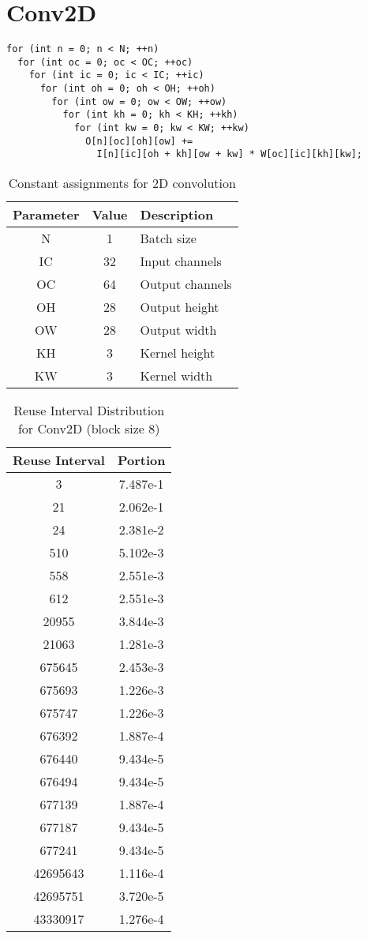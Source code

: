 \documentclass[conference]{article}
\begin{document}
\section{Conv2D}
\begin{verbatim}
for (int n = 0; n < N; ++n)
  for (int oc = 0; oc < OC; ++oc)
    for (int ic = 0; ic < IC; ++ic)
      for (int oh = 0; oh < OH; ++oh)
        for (int ow = 0; ow < OW; ++ow)
          for (int kh = 0; kh < KH; ++kh)
            for (int kw = 0; kw < KW; ++kw)
              O[n][oc][oh][ow] +=
                I[n][ic][oh + kh][ow + kw] * W[oc][ic][kh][kw];
\end{verbatim}

\begin{table}[h]
\centering
\begin{tabular}{|c|c|l|}
\hline
Parameter & Value & Description \\
\hline
 N & 1 & Batch size \\
IC & 32 & Input channels \\
OC & 64 & Output channels \\
OH & 28 & Output height \\
OW & 28 & Output width \\
KH & 3 & Kernel height \\
KW & 3 & Kernel width \\
\hline
\end{tabular}
\caption{Constant assignments for 2D convolution}
\end{table}

\begin{table}[H]
\centering
\begin{tabular}{|c|c|}
    \hline
    Reuse Interval & Portion \\ 
    \hline
    3 & 7.487e-1 \\ 
    21 & 2.062e-1 \\ 
    24 & 2.381e-2 \\ 
    510 & 5.102e-3 \\ 
    558 & 2.551e-3 \\ 
    612 & 2.551e-3 \\ 
    20955 & 3.844e-3 \\ 
    21063 & 1.281e-3 \\ 
    675645 & 2.453e-3 \\ 
    675693 & 1.226e-3 \\ 
    675747 & 1.226e-3 \\ 
    676392 & 1.887e-4 \\ 
    676440 & 9.434e-5 \\ 
    676494 & 9.434e-5 \\ 
    677139 & 1.887e-4 \\ 
    677187 & 9.434e-5 \\ 
    677241 & 9.434e-5 \\ 
    42695643 & 1.116e-4 \\ 
    42695751 & 3.720e-5 \\ 
    43330917 & 1.276e-4 \\ 
    \hline
\end{tabular}
\caption{Reuse Interval Distribution for Conv2D (block size 8)}
\end{table}
\end{document}

